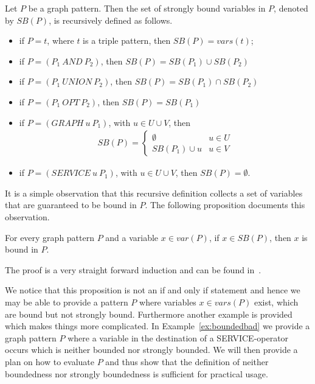 \begin{definition}\label{def:strongboundedness}
Let $P$ be a graph pattern. Then the set of strongly bound variables in $P$,
denoted by $SB(P)$, is recursively defined as follows.

\begin{itemize}
\item if $P =t$, where $t$ is a triple pattern, then $SB(P) = vars(t)$;
\item if $P = (P_1 \ AND \ P_2)$, then $SB(P) = SB(P_1) \cup SB(P_2)$ 
\item if $P = (P_1  \ UNION \ P_2)$, then $SB(P) = SB(P_1) \cap SB(P_2)$ 
\item if $P = (P_1 \ OPT \ P_2)$, then $SB(P) = SB(P_1)$ 
\item if $P = (GRAPH \ u \ P_1)$, with $u \in U\cup V$, 
then\\
\begin{align*}
	SB(P) = 
\begin{cases} 
    \emptyset & \mbox{$u \in U$} \\
    SB(P_1) \cup u &\mbox{$u \in V$} 
\end{cases}
\end{align*}

\item if $P = (SERVICE \ u \ P_1)$, with $u \in U \cup V$, then $SB(P) = \emptyset$.
\end{itemize}
\end{definition}

It is a simple observation that this recursive definition collects a set of
variables that are guaranteed to be bound in $P$. The following proposition
documents this observation.

\begin{proposition}\label{sbinb}
For every graph pattern $P$ and a variable $x \in var(P)$, if $x \in SB(P)$,
then $x$ is bound in $P$.
\end{proposition}
The proof is a very straight forward induction and can be found
in~\cite[Appendix A]{BuilAranda20131}.

We notice that this proposition is not an if and only if statement and hence we may be
able to provide a pattern $P$ where variables $x \in vars(P)$ exist, which are bound but not
strongly bound. Furthermore another example is provided which makes things more
complicated. In Example~\ref{ex:boundedbad} we provide a graph pattern $P$ where a variable in the
destination of a SERVICE-operator occurs which is neither bounded nor strongly
bounded. We will then provide a plan on how to evaluate $P$ and thus show that
the definition of neither boundedness nor strongly boundedness is sufficient for
practical usage. 


